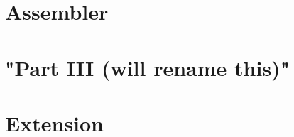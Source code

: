 \documentclass[11pt]{article}
\begin{document}
\section{Assembler}

\section{"Part III (will rename this)"}

\section{Extension}
\end{document}
